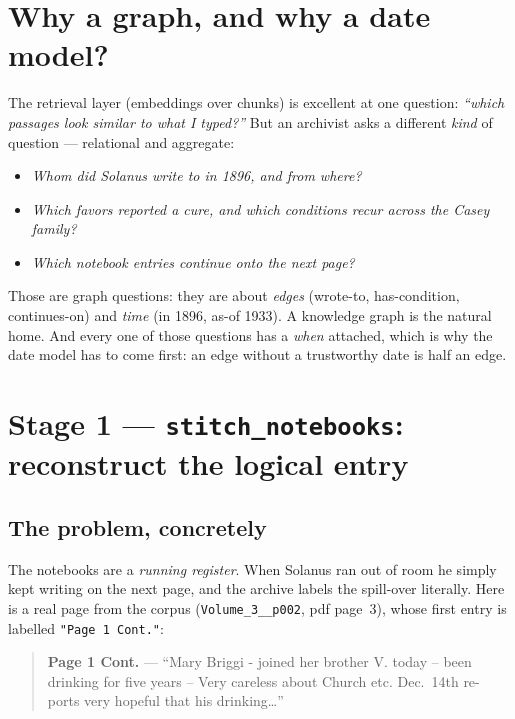 \documentclass[11pt]{article}
\newcommand{\code}[1]{\texttt{\small #1}}
\begin{document}
\section{Why a graph, and why a date model?}

The retrieval layer (embeddings over chunks) is excellent at one question: \emph{``which passages look
similar to what I typed?''} But an archivist asks a different \emph{kind} of question --- relational
and aggregate:

\begin{itemize}[leftmargin=1.4em]
  \item \emph{Whom did Solanus write to in 1896, and from where?}
  \item \emph{Which favors reported a cure, and which conditions recur across the Casey family?}
  \item \emph{Which notebook entries continue onto the next page?}
\end{itemize}

Those are graph questions: they are about \emph{edges} (wrote-to, has-condition, continues-on) and
\emph{time} (in 1896, as-of 1933). A knowledge graph is the natural home. And every one of those
questions has a \emph{when} attached, which is why the date model has to come first: an edge without a
trustworthy date is half an edge.

\section{Stage 1 --- \texttt{stitch\_notebooks}: reconstruct the logical entry}

\subsection{The problem, concretely}

The notebooks are a \emph{running register}. When Solanus ran out of room he simply kept writing on the
next page, and the archive labels the spill-over literally. Here is a real page from the corpus
(\code{Volume\_3\_\_p002}, pdf page~3), whose first entry is labelled \code{"Page 1 Cont."}:

\begin{quote}\small
\textbf{Page 1 Cont.} --- ``Mary Briggi - joined her brother V. today -- been drinking for five years
-- Very careless about Church etc. Dec.\ 14th re- ports very hopeful that his drinking\ldots''
\end{quote}
\end{document}
